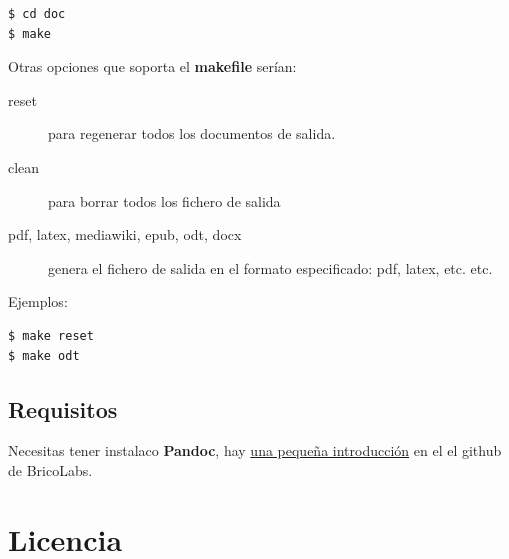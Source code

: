 \documentclass[12pt,spanish,]{scrartcl}
\begin{document}
\begin{verbatim}
$ cd doc
$ make
\end{verbatim}

Otras opciones que soporta el \textbf{makefile} serían:

\begin{description}
\item[reset]
para regenerar todos los documentos de salida.
\item[clean]
para borrar todos los fichero de salida
\item[pdf, latex, mediawiki, epub, odt, docx]
genera el fichero de salida en el formato especificado: pdf, latex, etc.
etc.
\end{description}

Ejemplos:

\begin{verbatim}
$ make reset
$ make odt
\end{verbatim}

\subsection{Requisitos}\label{requisitos}

Necesitas tener instalaco \textbf{Pandoc}, hay
\href{https://github.com/brico-labs/pandoc_basico}{una pequeña
introducción} en el el github de BricoLabs.

\section{Licencia}\label{licencia}
\end{document}
